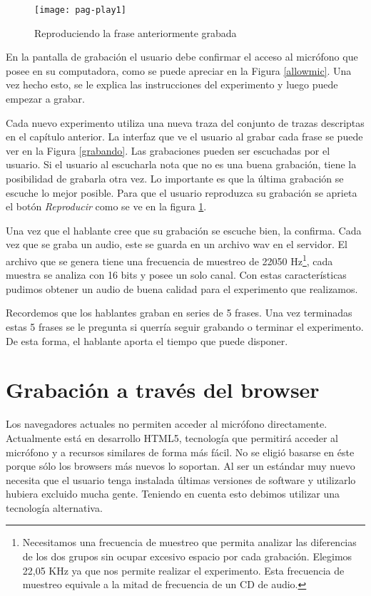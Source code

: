 \begin{figure}[h!]
    \centerline{\texttt{[image: pag-play1]} }
    \caption{Reproduciendo la frase anteriormente grabada}
    \label{reproduciendo}
\end{figure}

En la pantalla de grabación el usuario debe confirmar el acceso al micrófono que posee en su computadora, como se puede apreciar en la Figura \ref{allowmic}. Una vez hecho esto, se le explica las instrucciones del experimento y luego puede empezar a grabar. 

Cada nuevo experimento utiliza una nueva traza del conjunto de trazas descriptas en el capítulo anterior. La interfaz que ve el usuario al grabar cada frase se puede ver en la Figura \ref{grabando}. Las grabaciones pueden ser escuchadas por el usuario. Si el usuario al escucharla nota que no es una buena grabación, tiene la posibilidad de grabarla otra vez. Lo importante es que la última grabación se escuche lo mejor posible. Para que el usuario reproduzca su grabación se aprieta el botón \textit{Reproducir} como se ve en la figura \ref{reproduciendo}. 

Una vez que el hablante cree que su grabación se escuche bien, la confirma. Cada vez que se graba un audio, este se guarda en un archivo wav en el servidor. El archivo que se genera tiene una frecuencia de muestreo de 22050 Hz\footnote{Necesitamos una frecuencia de muestreo que permita analizar las diferencias de los dos grupos sin ocupar excesivo espacio por cada grabación. Elegimos 22,05 KHz ya que nos permite realizar el experimento. Esta frecuencia de muestreo equivale a la mitad de frecuencia de un CD de audio. }, cada muestra se analiza con 16 bits y posee un solo canal. Con estas características pudimos obtener un audio de buena calidad para el experimento que realizamos.

Recordemos que los hablantes graban en series de 5 frases. Una vez terminadas estas 5 frases se le pregunta si querría seguir grabando o terminar el experimento. De esta forma, el hablante aporta el tiempo que puede disponer.

\section{Grabación a través del browser}

Los navegadores actuales no permiten acceder al micrófono directamente. Actualmente está en desarrollo HTML5, tecnología que permitirá acceder al micrófono y a recursos similares de forma más fácil. No se eligió basarse en éste porque sólo los browsers más nuevos lo soportan. Al ser un estándar muy nuevo necesita que el usuario tenga instalada últimas versiones de software y utilizarlo hubiera excluido mucha gente. Teniendo en cuenta esto debimos utilizar una tecnología alternativa. 

